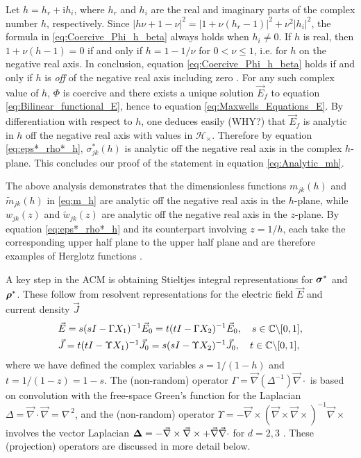\documentclass[11pt]{amsart}
\newcommand{\I}{\mathrm{i}}
\newcommand\bsig{\mbox{\boldmath${\sigma}$}}
\newcommand\brho{\mbox{\boldmath${\rho}$}}
\newcommand\bDelta{\mbox{\boldmath${\Delta}$}}
\begin{document}
Let $h=h_r+\I h_i$, where $h_r$ and $h_i$ are the real and imaginary
parts of the complex number $h$, respectively. Since 
$|h\nu+1-\nu|^2=|1+\nu(h_r-1)|^2+\nu^2|h_i|^2$, the formula in
\eqref{eq:Coercive_Phi_h_beta} always holds when $h_i\neq0$. If $h$ is
real, then $1+\nu(h-1)=0$ if and only if $h=1-1/\nu$  
for $0<\nu\leq1$, i.e. for $h$ on the negative real axis. In conclusion,
equation \eqref{eq:Coercive_Phi_h_beta} holds if and only if $h$ is
\emph{off} of the negative real axis including zero
\cite{Golden:CMP-473}. For any such complex value of $h$, $\Phi$ is
coercive and there exists a unique solution $\vec{E}_f$ to equation
\eqref{eq:Bilinear_functional_E}, hence to equation
\eqref{eq:Maxwells_Equations_E}. By differentiation with respect to
$h$, one deduces easily (WHY?) that $\vec{E}_f$ is analytic
in $h$ off the negative real axis with values in
$\mathscr{H}_\times$. Therefore by equation \eqref{eq:eps*_rho*_h},
$\sigma^*_{jk}(h)$ is analytic off the negative real axis in the complex
$h$-plane. This concludes our proof of the statement in equation
\eqref{eq:Analytic_mh}. 




The above analysis \cite{Golden:CMP-473} demonstrates that the
dimensionless functions $m_{jk}(h)$ and $\tilde{m}_{jk}(h)$ in
\eqref{eq:m_h} are analytic off the negative real axis in the
$h$-plane, while $w_{jk}(z)$ and $\tilde{w}_{jk}(z)$ are analytic off
the negative real axis in the $z$-plane. By equation
\eqref{eq:eps*_rho*_h} and its counterpart involving $z=1/h$, each
take the corresponding upper half plane to the upper half plane and
are therefore examples of Herglotz functions
\cite{Deift:2000:RMT,Golden:CMP-473}. 



A key step in the ACM is
obtaining Stieltjes integral representations for $\bsig^*$ and
$\brho^*$. These follow from resolvent representations for the
electric field $\vec{E}$ \cite{Golden:CMP-473} and current density
$\vec{J}$ \cite{Murphy:JMP:063506}         
%
\begin{align}\label{eq:Resolvent_representations_E_D}
  &\vec{E}=s(sI-\Gamma X_1)^{-1}\vec{E}_0=t(tI-\Gamma X_2)^{-1}\vec{E}_0 ,
  \quad
   s\in\mathbb{C}\backslash[0,1],\\
  &\vec{J}=t(tI-\Upsilon X_1)^{-1}\vec{J}_0=s(sI-\Upsilon X_2)^{-1}\vec{J}_0 ,
  \quad
   t\in\mathbb{C}\backslash[0,1],\notag 
\end{align}
%
where we have defined the complex variables $s=1/(1-h)$ and
$t=1/(1-z)=1-s$.  
The (non-random) operator $\Gamma=\vec{\nabla}(\Delta^{-1})\vec{\nabla}\cdot$ is based on
convolution with the free-space Green's function for the Laplacian
$\Delta=\vec{\nabla}\cdot\vec{\nabla}=\nabla^{\,2}$, and the (non-random) operator
$\Upsilon=-\vec{\nabla}\times(\vec{\nabla}\times\vec{\nabla}\times)^{-1}\vec{\nabla}\times$ involves the vector
Laplacian $\bDelta=- \vec{\nabla}\times\vec{\nabla}\times + \vec{\nabla}\vec{\nabla}\cdot $ for $d=2,3$
\cite{Golden:CMP-473,Murphy:JMP:063506}. These (projection) operators
are discussed in more detail below.      
\end{document}
